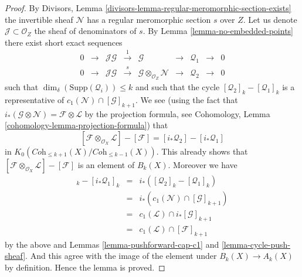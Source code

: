 \begin{proof}
\medskip\noindent
By Divisors, Lemma \ref{divisors-lemma-regular-meromorphic-section-exists}
the invertible sheaf $\mathcal{N}$ has a regular meromorphic section $s$
over $Z$. Let us denote $\mathcal{J} \subset \mathcal{O}_Z$ the sheaf
of denominators of $s$. By Lemma \ref{lemma-no-embedded-points}
there exist short exact sequences
$$
\begin{matrix}
0 &
\to &
\mathcal{J}\mathcal{G} &
\xrightarrow{1} &
\mathcal{G} &
\to &
\mathcal{Q}_1 &
\to &
0 \\
0 &
\to &
\mathcal{J}\mathcal{G} &
\xrightarrow{s} &
\mathcal{G} \otimes_{\mathcal{O}_Z} \mathcal{N} &
\to &
\mathcal{Q}_2 &
\to &
0
\end{matrix}
$$
such that $\dim_\delta(\text{Supp}(\mathcal{Q}_i)) \leq k$ and
such that the cycle
$
[\mathcal{Q}_2]_k - [\mathcal{Q}_1]_k
$
is a representative of $c_1(\mathcal{N}) \cap [\mathcal{G}]_{k + 1}$.
We see (using the fact that
$i_*(\mathcal{G} \otimes \mathcal{N}) = \mathcal{F} \otimes \mathcal{L}$
by the projection formula, see
Cohomology, Lemma \ref{cohomology-lemma-projection-formula})
that
$$
[\mathcal{F} \otimes_{\mathcal{O}_X} \mathcal{L}]
-
[\mathcal{F}]
=
[i_*\mathcal{Q}_2] - [i_*\mathcal{Q}_1]
$$
in $K_0(\textit{Coh}_{\leq k + 1}(X)/\textit{Coh}_{\leq k - 1}(X))$.
This already shows that
$[\mathcal{F} \otimes_{\mathcal{O}_X} \mathcal{L}] - [\mathcal{F}]$
is an element of $B_k(X)$. Moreover we have
\begin{eqnarray*}
[i_*\mathcal{Q}_2]_k - [i_*\mathcal{Q}_1]_k
& = &
i_*\left( [\mathcal{Q}_2]_k - [\mathcal{Q}_1]_k \right) \\
& = &
i_*\left(c_1(\mathcal{N}) \cap [\mathcal{G}]_{k + 1} \right) \\
& = &
c_1(\mathcal{L}) \cap i_*[\mathcal{G}]_{k + 1} \\
& = &
c_1(\mathcal{L}) \cap [\mathcal{F}]_{k + 1}
\end{eqnarray*}
by the above and Lemmas \ref{lemma-pushforward-cap-c1}
and \ref{lemma-cycle-push-sheaf}. And this agree with the
image of the element under $B_k(X) \to A_k(X)$ by definition.
Hence the lemma is proved.
\end{proof}



















